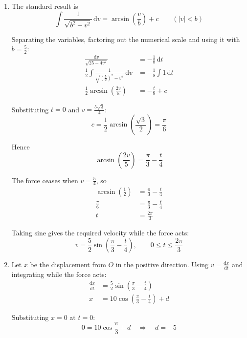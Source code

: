 \documentclass[leqno]{article}
\begin{document}
\begin{enumerate}[
  label=\textbf{\arabic*.},
  leftmargin=*,
  topsep=0pt,
  partopsep=0pt,
  parsep=0pt
]
\begin{djsSolution}
\begin{enumerate}[label=\textbf{(\alph*)}, start=1]
  Using Newton's second law, with acceleration \(a=\frac{\mathrm{d}v}{\mathrm{d}t}\):
  \begin{align*}
  16\frac{\mathrm{d}v}{\mathrm{d}t}&=-2\sqrt{25-4v^2}\\
  \frac{1}{\sqrt{25-4v^2}}\frac{\mathrm{d}v}{\mathrm{d}t}&=-\frac18
  \end{align*}

  \item The standard result is
  \[
  \int\frac{1}{\sqrt{b^2-v^2}}\,\mathrm{d}v=\arcsin\left(\frac{v}{b}\right)+c\qquad(|v|<b)
  \]

  Separating the variables, factoring out the numerical scale and using it with \(b=\frac52\):
  \begin{align*}
  \frac{\mathrm{d}v}{\sqrt{25-4v^2}}&=-\frac18\,\mathrm{d}t\\
  \frac12\int\frac{1}{\sqrt{\left(\frac52\right)^2-v^2}}\,\mathrm{d}v
  &=-\frac18\int 1\,\mathrm{d}t\\
  \frac12\arcsin\left(\frac{2v}{5}\right)&=-\frac{t}{8}+c
  \end{align*}

  Substituting \(t=0\) and \(v=\frac{5\sqrt3}{4}\):
  \[
  c=\frac12\arcsin\left(\frac{\sqrt3}{2}\right)=\frac{\pi}{6}
  \]

  Hence
  \[
  \arcsin\left(\frac{2v}{5}\right)=\frac{\pi}{3}-\frac{t}{4}
  \]

  The force ceases when \(v=\frac54\), so
  \begin{align*}
  \arcsin\left(\frac12\right)&=\frac{\pi}{3}-\frac{t}{4}\\
  \frac{\pi}{6}&=\frac{\pi}{3}-\frac{t}{4}\\
  t&=\frac{2\pi}{3}
  \end{align*}

  Taking sine gives the required velocity while the force acts:
  \[
  v=\frac52\sin\left(\frac{\pi}{3}-\frac{t}{4}\right),
  \qquad 0\leq t\leq\frac{2\pi}{3}
  \]

  \item Let \(x\) be the displacement from \(O\) in the positive direction. Using \(v=\frac{\mathrm{d}x}{\mathrm{d}t}\) and integrating while the force acts:
  \begin{align*}
  \frac{\mathrm{d}x}{\mathrm{d}t}&=\frac52\sin\left(\frac{\pi}{3}-\frac{t}{4}\right)\\
  x&=10\cos\left(\frac{\pi}{3}-\frac{t}{4}\right)+d
  \end{align*}

  Substituting \(x=0\) at \(t=0\):
  \[
  0=10\cos\frac{\pi}{3}+d
  \quad\Longrightarrow\quad d=-5
  \]


\end{enumerate}
\end{djsSolution}
\end{enumerate}
\end{document}

